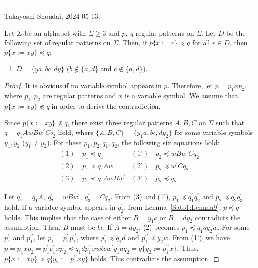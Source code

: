 \bigskip
\hrule
\smallskip
\hfill Takayoshi Shoudai, 2024-05-13.

\begin{lem}\label{追加部分}
  Let $\Sigma$ be an alphabet with $\Sigma \ge 3$ and $p,~q$ regular patterns on $\Sigma$.
  Let $D$ be the following set of regular patterns on $\Sigma$.
  Then, if $p \{ x := r \} \preceq q$ for all $r \in D$, then $p \{ x := xy \} \preceq q$:
  \begin{enumerate}
  \item[] $D = \{ ya, bc, dy \}$ $(b \not\in \{a,d\}$ and $c \not\in \{a,d\})$.
  \end{enumerate}
\end{lem}

  \begin{proof}
  It is obvious if no variable symbol appears in $p$.
  Therefore, let $p=p_{1}xp_{2}$, where $p_{1}, p_{2}$ are regular patterns and $x$ is a variable symbol.
  We assume that $p \{ x := xy \} \not \preceq q$ in order to derive the contradiction.

  Since $p \{ x := xy \} \not \preceq q$, there exist three regular patterns $A,B,C$ on $\Sigma$ such that $q=q_{1}AwBw^{\prime}Cq_{2}$ hold, where $\{ A,B,C \} = \{ y_{1}a,bc,dy_{2} \}$ for some variable symbols $y_{1}, y_{2}$ ($y_{1} \not= y_{2}$).
  For these $p_{1},p_{2},q_{1},q_{2}$, the following six equations hold:
  \begin{align*}
  (1)~& p_{1} \preceq q_{1} & (\text{1'})~& p_{2} \preceq wBw^{\prime}Cq_{2} \\
  (2)~& p_{1} \preceq q_{1}Aw & (\text{2'})~& p_{2} \preceq w^{\prime}Cq_{2} \\
  (3)~& p_{1} \preceq q_{1}AwBw^{\prime} & (\text{3'})~& p_{2} \preceq q_{2}
  \end{align*}
  
  Let $q^{\prime}_{1}=q_{1}A,~q^{\prime}_{2}=wBw^{\prime},~q^{\prime}_{3}=Cq_{2}$.
  From (3) and (1'), $p_{1} \preceq q^{\prime}_{1}q^{\prime}_{2}$ and $p_{2} \preceq q^{\prime}_{2}q^{\prime}_{3}$ hold.
  If a variable symbol appears in $q^{\prime}_{2}$, from Lemma~\ref{Sato1:Lemma9}, $p \preceq q$ holds.
  This implies that the case of either $B=y_{1}a$ or $B=dy_{2}$ contradicts the assumption.
  Then, $B$ must be $bc$.
  If $A=dy_{2}$,
  (2) becomes $p_{1} \preceq q_{1}dy_{2}w$.
  For some $p^{\prime}_{1}$ and $p^{\prime\prime}_{1}$, let $p_{1}=p^{\prime}_{1}p^{\prime\prime}_{1}$, where $p^{\prime}_{1} \preceq q_{1}d$ and $p^{\prime\prime}_{1} \preceq y_{2}w$. 
  From (1'), we have $p=p_{1}xp_{2}=p^{\prime}_{1}p^{\prime\prime}_{1}xp_{2} \preceq q_{1}dp^{\prime\prime}_{1}xwbcw^{\prime}y_{1}aq_{2}=q \{ y_{2}:=p^{\prime\prime}_{1}x \}$.
  Thus, $p \{ x := xy \} \preceq q \{ y_{2}:=p^{\prime\prime}_{1}xy \}$ holds. This contradicts the assumption.


\end{proof}
